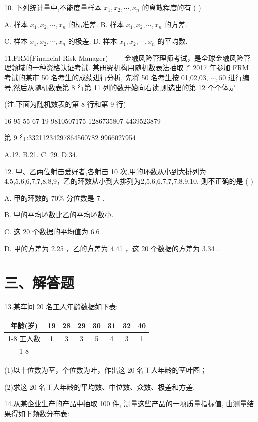 10. 下列统计量中,不能度量样本 ${x}_{1},{x}_{2},\cdots ,{x}_{n}$ 的离散程度的有 ( )

A. 样本 ${x}_{1},{x}_{2},\cdots ,{x}_{n}$ 的标准差. B. 样本 ${x}_{1},{x}_{2},\cdots ,{x}_{n}$ 的方差.

C. 样本 ${x}_{1},{x}_{2},\cdots ,{x}_{n}$ 的极差. D. 样本 ${x}_{1},{x}_{2},\cdots ,{x}_{n}$ 的平均数.

11.FRM(Financial Risk Manager) ——金融风险管理师考试，是全球金融风险管理领域的一种资格认证考试. 某研究机构用随机数表法抽取了 2017 年参加 FRM 考试的某市 50 名考生的成绩进行分析, 先将 50 名考生按 01,02,03, $\cdots ,{50}$ 进行编号,然后从随机数表第 8 行第 11 列的数开始向右读,则选出的第 12 个个体是

(注:下面为随机数表的第 8 行和第 9 行)

16 95 55 67 19 9810507175 1286735807 4439523879

第 9 行:33211234297864560782 9966027954

A.12. B.21. C. 29. D.34.

12. 甲、乙两位射击爱好者,各射击 10 次,甲的环数从小到大排列为4,5,5,6,6,7,7,8,8,9，乙的环数从小到大排列为2,5,6,6,7,7,7,8.9,10. 则不正确的是 ( )

A. 甲的环数的 70\% 分位数是 7 .

B. 甲的平均环数比乙的平均环数小.

C. 这 20 个数据的平均值为 6.6 .

D. 甲的方差为 2.25 ，乙的方差为 4.41 ，这 20 个数据的方差为 3.34 .

\section*{三、解答题}

13.某车间 20 名工人年龄数据如下表:

\begin{center}
\begin{tabular}{|c|c|c|c|c|c|c|c|}
\hline
年龄(岁) & 19 & 28 & 29 & 30 & 31 & 32 & 40 \\
\cline{1-8}
工人数 & 1 & 3 & 3 & 5 & 4 & 3 & 1 \\
\cline{1-8}
\hline
\end{tabular}
\end{center}

(1)以十位数为茎，个位数为叶，作出这 20 名工人年龄的茎叶图；

(2)求这 20 名工人年龄的平均数、中位数、众数、极差和方差.

14.从某企业生产的产品中抽取 100 件, 测量这些产品的一项质量指标值, 由测量结果得如下频数分布表:

